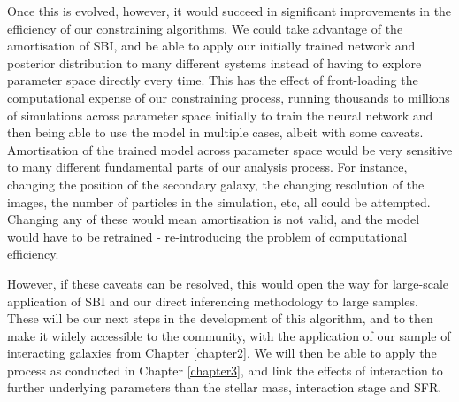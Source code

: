 Once this is evolved, however, it would succeed in significant improvements in the efficiency of our constraining algorithms. We could take advantage of the amortisation of SBI, and be able to apply our initially trained network and posterior distribution to many different systems instead of having to explore parameter space directly every time. This has the effect of front-loading the computational expense of our constraining process, running thousands to millions of simulations across parameter space initially to train the neural network and then being able to use the model in multiple cases, albeit with some caveats. Amortisation of the trained model across parameter space would be very sensitive to many different fundamental parts of our analysis process. For instance, changing the position of the secondary galaxy, the changing resolution of the images, the number of particles in the simulation, etc, all could be attempted. Changing any of these would mean amortisation is not valid, and the model would have to be retrained - re-introducing the problem of computational efficiency. 

However, if these caveats can be resolved, this would open the way for large-scale application of SBI and our direct inferencing methodology to large samples. These will be our next steps in the development of this algorithm, and to then make it widely accessible to the community, with the application of our sample of interacting galaxies from Chapter \ref{chapter2}. We will then be able to apply the process as conducted in Chapter \ref{chapter3}, and link the effects of interaction to further underlying parameters than the stellar mass, interaction stage and SFR.
